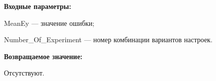 \textbf{Входные параметры:}

MeanEy --- значение ошибки;
 
    Number\_Of\_Experiment --- номер комбинации вариантов настроек.

\textbf{Возвращаемое значение:}

Отсутствуют.